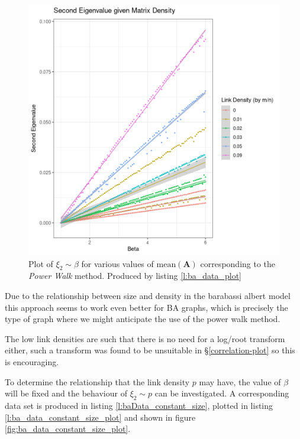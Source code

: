 \documentclass[11pt]{report}
\begin{document}
\begin{figure}[htbp]
\centering
\includegraphics[width=12cm]{media/constant_dens_ba_density_sqrt.png}
\caption{\label{fig:ba_data_plot} Plot of \(\xi_{2}\sim \beta\) for various values of \(\mathrm{mean}\left(\mathbf{A}\right)\) corresponding to the \textit{Power Walk} method. Produced by listing \ref{l:ba_data_plot} }
\end{figure}

Due to the relationship between size and density in the barabassi albert model this approach seems to work even better for BA graphs, which is precisely the type of graph where we might anticipate the use of the power walk method.

The low link densities are such that there is no need for a log/root transform either, such a transform was found to be unsuitable in \S \ref{correlation-plot} so this is encouraging.

To determine the relationship that the link density \(p\) may have, the value of
\(\beta\) will be fixed and the behaviour of \(\xi_{2} \sim p\) can be
investigated. A corresponding data set is produced in listing
\ref{l:baData_constant_size}, plotted in listing \ref{l:ba_data_constant_size_plot} and
shown in figure \ref{fig:ba_data_constant_size_plot}.
\end{document}
